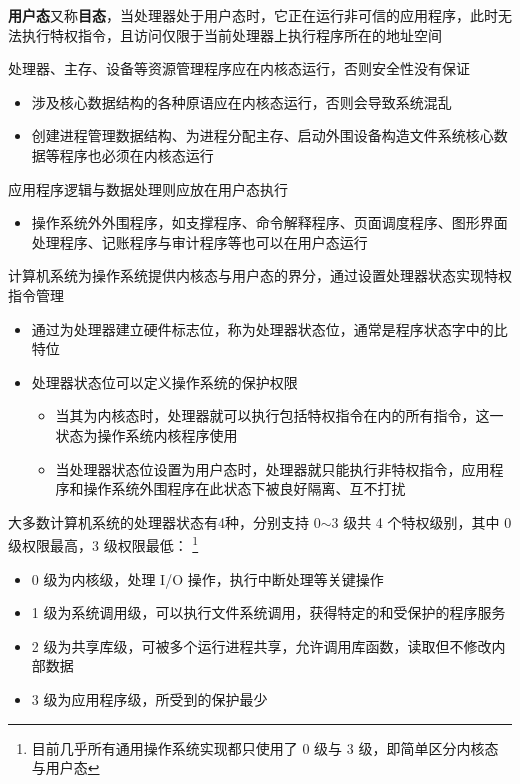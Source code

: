 \documentclass[cs4size,a4paper,10pt]{ctexart}
\begin{document}
	\textbf{用户态}又称\textbf{目态}，当处理器处于用户态时，它正在运行非可信的应用程序，此时无法执行特权指令，且访问仅限于当前处理器上执行程序所在的地址空间
	
	处理器、主存、设备等资源管理程序应在内核态运行，否则安全性没有保证
	\begin{itemize}
		\item 涉及核心数据结构的各种原语应在内核态运行，否则会导致系统混乱
		\item 创建进程管理数据结构、为进程分配主存、启动外围设备构造文件系统核心数据等程序也必须在内核态运行
	\end{itemize}

	应用程序逻辑与数据处理则应放在用户态执行
	\begin{itemize}
		\item 操作系统外外围程序，如支撑程序、命令解释程序、页面调度程序、图形界面处理程序、记账程序与审计程序等也可以在用户态运行
	\end{itemize}

	计算机系统为操作系统提供内核态与用户态的界分，通过设置处理器状态实现特权指令管理
	\begin{itemize}
		\item 通过为处理器建立硬件标志位，称为处理器状态位，通常是程序状态字中的比特位
		\item 处理器状态位可以定义操作系统的保护权限
		\begin{itemize}
			\item 当其为内核态时，处理器就可以执行包括特权指令在内的所有指令，这一状态为操作系统内核程序使用
			\item 当处理器状态位设置为用户态时，处理器就只能执行非特权指令，应用程序和操作系统外围程序在此状态下被良好隔离、互不打扰
		\end{itemize}
	\end{itemize}

	大多数计算机系统的处理器状态有4种，分别支持 0$\sim$3 级共 4 个特权级别，其中 0 级权限最高，3 级权限最低：
	\footnote{目前几乎所有通用操作系统实现都只使用了 0 级与 3 级，即简单区分内核态与用户态}
	\begin{itemize}
		\item 0 级为内核级，处理 I/O 操作，执行中断处理等关键操作
		\item 1 级为系统调用级，可以执行文件系统调用，获得特定的和受保护的程序服务
		\item 2 级为共享库级，可被多个运行进程共享，允许调用库函数，读取但不修改内部数据
		\item 3 级为应用程序级，所受到的保护最少
	\end{itemize}
\end{document}
